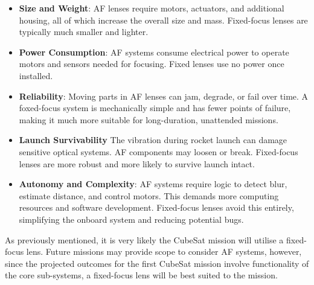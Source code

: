 \begin{itemize}
    \item \textbf{Size and Weight}: AF lenses require motors, actuators, and additional housing, all of which increase the overall size and mass. Fixed-focus lenses are typically much smaller and lighter.
    \item \textbf{Power Consumption}: AF systems consume electrical power to operate motors and sensors needed for focusing. Fixed lenses use no power once installed.
    \item \textbf{Reliability}: Moving parts in AF lenses can jam, degrade, or fail over time. A foxed-focus system is mechanically simple and has fewer points of failure, making it much more suitable for long-duration, unattended missions.
    \item \textbf{Launch Survivability} The vibration during rocket launch can damage sensitive optical systems. AF components may loosen or break. Fixed-focus lenses are more robust and more likely to survive launch intact.
    \item \textbf{Autonomy and Complexity}: AF systems require logic to detect blur, estimate distance, and control motors. This demands more computing resources and software development. Fixed-focus lenses avoid this entirely, simplifying the onboard system and reducing potential bugs.
\end{itemize}
As previously mentioned, it is very likely the CubeSat mission will utilise a fixed-focus lens. Future missions may provide scope to consider AF systems, however, since the projected outcomes for the first CubeSat mission involve functionality of the core sub-systems, a fixed-focus lens will be best suited to the mission.

